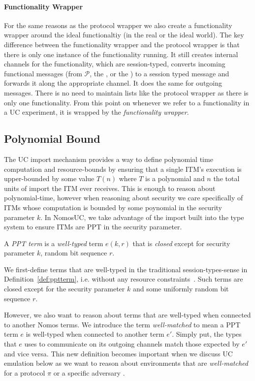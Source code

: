 \paragraph{Functionality Wrapper}
For the same reasons as the protocol wrapper we also create a functionality wrapper around the ideal functionaltiy (in the real or the ideal world).
The key difference between the functionality wrapper and the protocol wrapper is that there is only one instance of the functionality running.
It still creates internal channels for the functionality, which are session-typed, converts incoming functional messages (from $\mathcal{P}$, the \Environment, or the \Adversary) to a session typed message and forwards it along the appropriate channel. It does the same for outgoing messages. 
There is no need to maintain lists like the protocol wrapper as there is only one functionality.
From this point on whenever we refer to a functionality in a UC experiment, it is wrapped by the \textit{functionality wrapper}.

\subsection{Polynomial Bound}
The UC import mechanism provides a way to define polynomial time computation and resource-bounds by ensuring that a single ITM's execution is upper-bounded by some value $T(n)$ where $T$ is a polynomial and $n$ the total units of import the ITM ever receives.
This is enough to reason about polynomial-time, however when reasoning about security we care specifically of ITMs whose computation is bounded by some poynomial in the security parameter $k$. 
In NomosUC, we take advantage of the import built into the type system to ensure ITMs are PPT in the security parameter. 

\begin{definition}\label{def:pptterm}
A \textit{PPT term} is a \textit{well-typed} term $e(k, r)$ that is \textit{closed} except for security parameter $k$, random bit sequence $r$.
\end{definition}

We first-define terms that are well-typed in the traditional session-types-sense in Definition~\ref{def:pptterm}, i.e. without any resource constraints~\cite{sessiontypes}.
Such terms are closed except for the security parameter $k$ and some uniformly random bit sequence $r$.

However, we also want to reason about terms that are well-typed when connected to another Nomos terms.
We introduce the term \textit{well-matched} to mean a PPT term $e$ is well-typed when connected to another term $e'$.
Simply put, the types that $e$ uses to communicate on its outgoing channels match those expected by $e'$ and vice versa.
This new definition becomes important when we discuss UC emulation below as we want to reason about environments that are \textit{well-matched} for a protocol $\pi$ or a specific adversary \Adversary.

